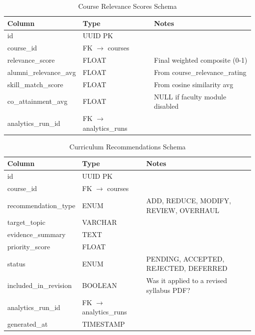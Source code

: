 {\begin{table}[h]
    \centering
    \caption{Course Relevance Scores Schema}
    \begin{tabularx}{\textwidth}{|p{}|p{}|X|}
        \hline
        \textbf{Column} & \textbf{Type} & \textbf{Notes} \\ \hline
        id & UUID PK & \\ \hline
        course\_id & FK $\rightarrow$ courses & \\ \hline
        relevance\_score & FLOAT & Final weighted composite (0-1) \\ \hline
        alumni\_relevance\_avg & FLOAT & From course\_relevance\_rating \\ \hline
        skill\_match\_score & FLOAT & From cosine similarity avg \\ \hline
        co\_attainment\_avg & FLOAT & NULL if faculty module disabled \\ \hline
        analytics\_run\_id & FK $\rightarrow$ analytics\_runs & \\ \hline
    \end{tabularx}
\end{table}

\begin{table}[h]
    \centering
    \caption{Curriculum Recommendations Schema}
    \begin{tabularx}{\textwidth}{|p{}|p{}|X|}
        \hline
        \textbf{Column} & \textbf{Type} & \textbf{Notes} \\ \hline
        id & UUID PK & \\ \hline
        course\_id & FK $\rightarrow$ courses & \\ \hline
        recommendation\_type & ENUM & ADD, REDUCE, MODIFY, REVIEW, OVERHAUL \\ \hline
        target\_topic & VARCHAR & \\ \hline
        evidence\_summary & TEXT & \\ \hline
        priority\_score & FLOAT & \\ \hline
        status & ENUM & PENDING, ACCEPTED, REJECTED, DEFERRED \\ \hline
        included\_in\_revision & BOOLEAN & Was it applied to a revised syllabus PDF? \\ \hline
        analytics\_run\_id & FK $\rightarrow$ analytics\_runs & \\ \hline
        generated\_at & TIMESTAMP & \\ \hline
    \end{tabularx}
\end{table}

}
